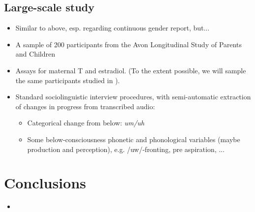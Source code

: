 \documentclass[a0,portrait]{a0poster}
\begin{document}
\begin{multicols}{2}
\subsection{Large-scale study}


\begin{itemize}
	\item Similar to above, esp. regarding continuous gender report, but...
	\item A sample of 200 participants from the Avon Longitudinal Study of Parents and Children \citep[ALSPAC][]{alspac2001}
	\item Assays for maternal T and estradiol. (To the extent possible, we will sample the same participants studied in \citealt{hinesetal2002}). 
	\item Standard sociolinguistic interview procedures, with semi-automatic extraction of changes in progress from transcribed audio:
	\begin{itemize}
		\item Categorical change from below: \textsl{um/uh}
		\item Some below-consciousness phonetic and phonological variables (maybe production and perception), e.g. /uw/-fronting, pre aspiration, ...
	\end{itemize}
\end{itemize}


\color{SaddleBrown} %

\section*{Conclusions}

\begin{itemize}
\item 
\end{itemize}

\color{DarkSlateGray} %




\end{multicols}
\end{document}
